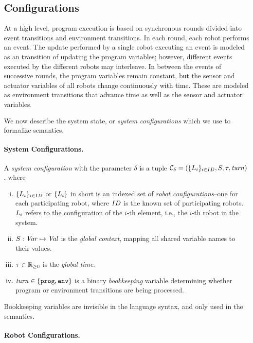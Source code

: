 \subsection{Configurations}\label{sec:configs}

At a high level, \lgname program execution is based on synchronous rounds divided into event transitions and environment transitions.
In each round, each robot performs an event.
The update performed by a single robot executing an event is modeled as an transition of updating the program variables;
however, different events executed by the different robots may interleave.
In between the events of successive rounds, the program variables remain constant,
but the sensor and actuator variables of all robots change continuously with time.
These are modeled as environment transitions that advance time as well as the sensor and actuator variables.

We now describe the system state, or \emph{system configurations} which we use to formalize \lgname semantics.

\paragraph{System Configurations.}

A {\em system configuration\/} with the parameter $\delta$ is a tuple
$\mathcal{C}_\delta = (\{L_{i}\}_{i\in ID},{S},\tau,\mathit{turn})$, where

\begin{enumerate}[i)]
\item $\{L_{i}\}_{i\in ID}$ or $\{L_{i}\}$ in short is an indexed set of \emph{robot configurations}--one for each participating robot,
      where $ID$ is the known set of participating robots.
      $L_{i}$ refers to the configuration of the $i$-th element, i.e., the $i$-th robot in the system.
\item ${S} : \mathit{Var} \mapsto \mathit{Val}$ is the {\em global context\/}, mapping all shared variable names to their values.
\item $\tau\in \nnreals$ is the {\em global time\/}.
\item $\mathit{turn}\in\{\mathtt{prog},\mathtt{env}\}$ is a binary \emph{bookkeeping} variable determining whether  program or environment transitions are being processed.
\end{enumerate}

Bookkeeping variables are invisible in the language syntax, and only used in the semantics.


\paragraph{Robot Configurations.}


